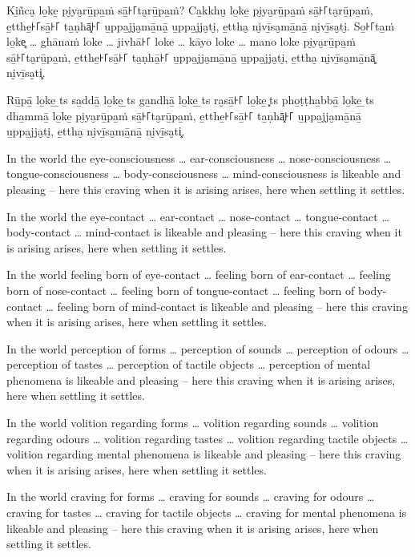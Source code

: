 Ki̱ñca̮ lo̱ke̱ pi̮ya̮rū̱pa̱ṁ sā̱꜔꜒ta̮rū̱pa̱ṁ? Ca̱kkhu̮ lo̱ke̱ pi̮ya̮rū̱pa̱ṁ sā̱꜔꜒ta̮rū̱pa̱ṁ, e̱tthe̱꜔꜒sā̱꜔꜒ ta̱ṇhā͓꜔꜒
u̱ppa̱jja̮mā̱nā̱ u̱ppa̱jja̮ti̮, e̱ttha̮ ni̮vī̱sa̮mā̱nā̱ ni̮vī̱sa̮ti̮. So̱꜔꜒ta̱ṁ lo̱ke͓
\ldots{} ghānaṁ loke \ldots{} jivhā꜔꜒ loke \ldots{} kāyo loke \ldots{} mano loke
pi̮ya̮rū̱pa̱ṁ sā̱꜔꜒ta̮rū̱pa̱ṁ, e̱tthe̱꜔꜒sā̱꜔꜒ ta̱ṇhā̱꜔꜒ u̱ppa̱jja̮mā̱nā̱ u̱ppa̱jja̮ti̮, e̱ttha̮ ni̮vī̱sa̮mā̱nā͓
ni̮vī̱sa̮ti͓.

Rū̱pā̱ lo̱ke̱ \ldo̱ts{} sa̱ddā̱ lo̱ke̱ \ldo̱ts{} ga̱ndhā̱ lo̱ke̱ \ldo̱ts{} ra̮sā̱꜔꜒ lo̱ke̱ \ldo͓ts{}
pho̱ṭṭha̱bbā̱ lo̱ke̱ \ldo̱ts{} dha̱mmā̱ lo̱ke̱ pi̮ya̮rū̱pa̱ṁ sā̱꜔꜒ta̮rū̱pa̱ṁ, e̱tthe̱꜔꜒sā̱꜔꜒ ta̱ṇhā͓꜔꜒
u̱ppa̱jja̮mā̱nā̱ u̱ppa̱jja̮ti̮, e̱ttha̮ ni̮vī̱sa̮mā̱nā̱ ni̮vī̱sa̮ti͓.

\englishPage

In the world the eye-consciousness \ldots{} ear-consciousness \ldots{} nose-consciousness
 \ldots{} tongue-consciousness \ldots{} body-consciousness \ldots{} mind-consciousness is likeable
and pleasing -- here this craving when it is arising arises, here when settling
it settles.

In the world the eye-contact \ldots{} ear-contact \ldots{} nose-contact \ldots{}
tongue-contact \ldots{} body-contact \ldots{} mind-contact is likeable and
pleasing -- here this craving when it is arising arises, here when settling it
settles.

In the world feeling born of eye-contact \ldots{} feeling born of ear-contact
\ldots{} feeling born of nose-contact \ldots{} feeling born of tongue-contact
\ldots{} feeling born of body-contact \ldots{} feeling born of mind-contact is
likeable and pleasing -- here this craving when it is arising arises, here when
settling it settles.

In the world perception of forms \ldots{} perception of sounds \ldots{}
perception of odours \ldots{} perception of tastes \ldots{} perception of
tactile objects \ldots{} perception of mental phenomena is likeable and pleasing
-- here this craving when it is arising arises, here when settling it settles.

In the world volition regarding forms \ldots{} volition regarding sounds
\ldots{} volition regarding odours \ldots{} volition regarding tastes \ldots{}
volition regarding tactile objects \ldots{} volition regarding mental phenomena
is likeable and pleasing -- here this craving when it is arising arises, here
when settling it settles.

In the world craving for forms \ldots{} craving for sounds \ldots{} craving for
odours \ldots{} craving for tastes \ldots{} craving for tactile objects \ldots{}
craving for mental phenomena is likeable and pleasing -- here this craving when
it is arising arises, here when settling it settles.

